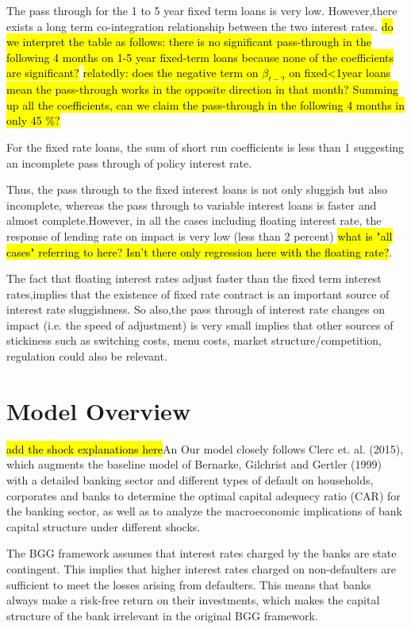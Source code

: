 \documentclass[12pt]{article}
\numberwithin{equation}{section}
\begin{document}
The pass through for the 1 to 5 year fixed term loans is very low.  However,there exists a long term co-integration relationship between the two interest rates. \hl{do we interpret the table as follows: there is no significant pass-through in the following 4 months on 1-5 year fixed-term loans because none of the coefficients are significant?  }
\hl{relatedly: does the negative term on $\beta_{t-2}$ on fixed<1year loans mean the pass-through works in the opposite direction in that month? Summing up all the coefficients, can we claim the pass-through in the following 4 months in only 45 \%? }

For the fixed rate loans, the sum of short run coefficients is less than 1 suggesting an incomplete pass through of policy interest rate.

Thus, the pass through to the fixed interest loans is not only sluggish but also incomplete, whereas the pass through to variable interest loans is faster and almost complete.However, in all the cases including floating interest rate, the response of lending rate on impact is very low (less than 2 percent) \hl{what is "all cases" referring to here? Isn't there only regression here with the floating rate?}.

The fact that  floating interest rates adjust faster than the fixed term interest rates,implies that the existence of fixed rate contract is an important source of interest rate sluggishness. So also,the pass through of interest rate changes on impact (i.e. the speed of adjustment) is very small implies that other sources of stickiness such as switching costs, menu costs, market structure/competition, regulation could also be relevant.




 
\section{Model Overview}
\hl{add the shock explanations here}An
Our model closely follows Clerc et. al. (2015), which augments the baseline model of Bernarke, Gilchrist and Gertler (1999) with a detailed banking sector and different types of default on households, corporates and banks to determine the optimal capital adequecy ratio (CAR) for the banking sector, as well as to analyze the macroeconomic implications of bank capital structure under different shocks. 

The BGG framework assumes that interest rates charged by the banks are state contingent. This implies that higher interest rates charged on non-defaulters are sufficient to meet the losses arising from defaulters. This means that banks always make a risk-free return on their investments, which makes the capital structure of the bank irrelevant in the original BGG framework.
\end{document}
